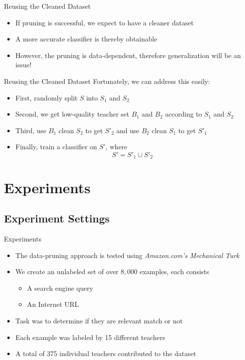 \documentclass[10pt,table,mathserif]{beamer}
\begin{document}
\begin{frame}{Reusing the Cleaned Dataset}
  \begin{itemize}
    \item If pruning is successful, we expect to have a cleaner dataset \pause
    \item A more accurate classifier is thereby obtainable \pause
    \item However, the pruning is data-dependent, therefore generalization will be an issue!
  \end{itemize}
\end{frame}

\begin{frame}{Reusing the Cleaned Dataset}
 Fortunately, we can address this easily:
 \begin{itemize}
    \item First, randomly split $S$ into $S_1$ and $S_2$ \pause
    \item Second, we get low-quality teacher set $B_1$ and $B_2$ according to $S_1$ and $S_2$ \pause
    \item Third, use $B_1$ clean $S_2$ to get $S'_2$ and use $B_2$ clean $S_1$ to get $S'_1$ \pause
    \item Finally, train a classifier on $S'$, where
      \[S' = S'_1 \cup S'_2\]
  \end{itemize}
\end{frame}
\section{Experiments}

\subsection{Experiment Settings}
\begin{frame}{Experiments} \pause
  \begin{itemize}
    \item The data-pruning approach is tested using \alert{\textsl{Amazon.com's Mechanical Turk}} \pause
    \item We create an unlabeled set of over \alert{$8,000$} examples, each consists
      \begin{itemize}
        \item A search engine query
        \item An Internet URL \pause
      \end{itemize}
    \item Task was to determine if they are relevant match or not \pause
    \item Each example was labeled by \alert{15} different teachers \pause
    \item A total of \alert{375} individual teachers contributed to the dataset
  \end{itemize}
\end{frame}
\end{document}
